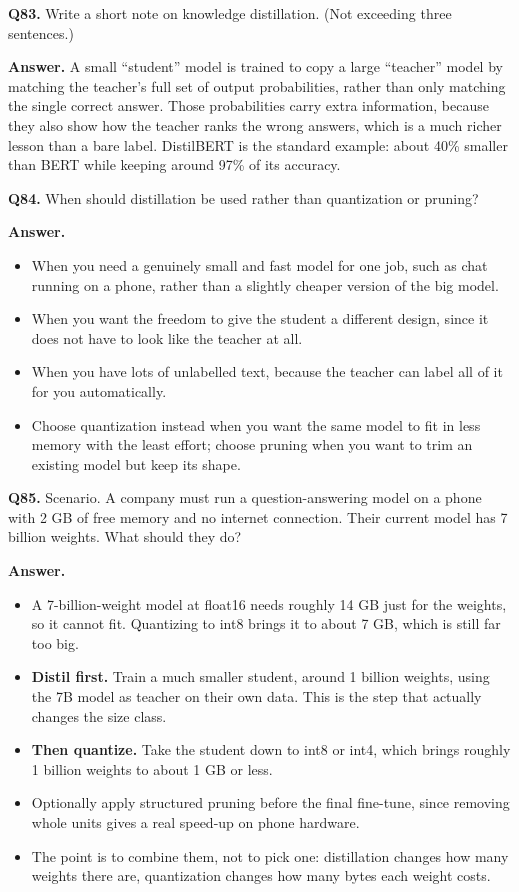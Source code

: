 \documentclass[11pt]{article}
\begin{document}
\medskip
\textbf{Q83.} Write a short note on knowledge distillation. (Not exceeding three sentences.)

\textbf{Answer.} A small ``student'' model is trained to copy a large ``teacher'' model by
matching the teacher's full set of output probabilities, rather than only matching the single
correct answer. Those probabilities carry extra information, because they also show how the
teacher ranks the wrong answers, which is a much richer lesson than a bare label. DistilBERT
is the standard example: about 40\% smaller than BERT while keeping around 97\% of its
accuracy.

\medskip
\textbf{Q84.} When should distillation be used rather than quantization or pruning?

\textbf{Answer.}
\begin{itemize}
  \item When you need a genuinely small and fast model for one job, such as chat running on a phone, rather than a slightly cheaper version of the big model.
  \item When you want the freedom to give the student a different design, since it does not have to look like the teacher at all.
  \item When you have lots of unlabelled text, because the teacher can label all of it for you automatically.
  \item Choose quantization instead when you want the same model to fit in less memory with the least effort; choose pruning when you want to trim an existing model but keep its shape.
\end{itemize}

\medskip
\textbf{Q85.} Scenario. A company must run a question-answering model on a phone with 2 GB of
free memory and no internet connection. Their current model has 7 billion weights. What should
they do?

\textbf{Answer.}
\begin{itemize}
  \item A 7-billion-weight model at float16 needs roughly 14 GB just for the weights, so it cannot fit. Quantizing to int8 brings it to about 7 GB, which is still far too big.
  \item \textbf{Distil first.} Train a much smaller student, around 1 billion weights, using the 7B model as teacher on their own data. This is the step that actually changes the size class.
  \item \textbf{Then quantize.} Take the student down to int8 or int4, which brings roughly 1 billion weights to about 1 GB or less.
  \item Optionally apply structured pruning before the final fine-tune, since removing whole units gives a real speed-up on phone hardware.
  \item The point is to combine them, not to pick one: distillation changes how many weights there are, quantization changes how many bytes each weight costs.
\end{itemize}
\end{document}
